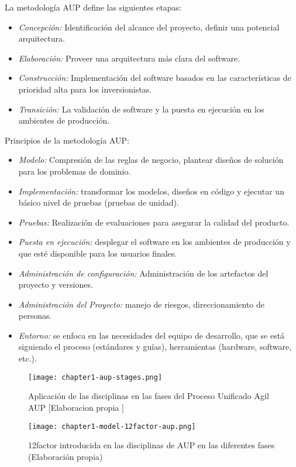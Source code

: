 \noindent La metodología AUP define las siguientes etapas:

\begin{itemize}
  \item \textit{Concepción:} Identificación del alcance del proyecto, definir una potencial arquitectura.
  \item \textit{Elaboración:} Proveer una arquitectura más clara del software.
  \item \textit{Construcción:} Implementación del software basados en las características de prioridad alta para los inversionistas. 
  \item \textit{Transición:} La validación de software y la puesta en ejecución en los ambientes de producción.
\end{itemize}

\noindent Principios de la metodología AUP:
\begin{itemize}
  \item \textit{Modelo:} Compresión de las reglas de negocio, plantear diseños de solución para los problemas de dominio.
  \item \textit{Implementación:} transformar los modelos, diseños en código y ejecutar un básico nivel de pruebas (pruebas de unidad).
  \item \textit{Pruebas:} Realización de evaluaciones para asegurar la calidad del producto.
  \item \textit{Puesta en ejecución:} desplegar el software en los ambientes de producción y que esté disponible para los usuarios finales.
  \item \textit{Administración de configuración:} Administración de los artefactos del proyecto y versiones.
  \item \textit{Administración del Proyecto:} manejo de riesgos, direccionamiento de personas.
  \item \textit{Entorno:} se enfoca en las necesidades del equipo de desarrollo, que se está siguiendo el proceso (estándares y guías), herramientas (hardware, software, etc.).
\end{itemize}

\begin{figure}[ht]
  \centering
  \texttt{[image: chapter1-aup-stages.png]}
  \caption{Aplicación de las disciplinas en las fases del Proceso Unificado Agil AUP [Elaboracion propia ]}  
\end{figure}

\begin{figure}[ht]
  \centering
  \texttt{[image: chapter1-model-12factor-aup.png]}
  \caption{12factor introducida en las disciplinas de AUP en las diferentes fases (Elaboración propia)}  
\end{figure}


